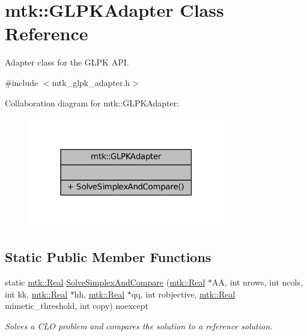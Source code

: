 \hypertarget{classmtk_1_1GLPKAdapter}{\section{mtk\+:\+:G\+L\+P\+K\+Adapter Class Reference}
\label{classmtk_1_1GLPKAdapter}
}


Adapter class for the G\+L\+P\+K A\+P\+I.  




{\ttfamily \#include $<$mtk\+\_\+glpk\+\_\+adapter.\+h$>$}



Collaboration diagram for mtk\+:\+:G\+L\+P\+K\+Adapter\+:\nopagebreak
\begin{figure}[H]
\begin{center}
\leavevmode
\includegraphics[width=243pt]{classmtk_1_1GLPKAdapter__coll__graph}
\end{center}
\end{figure}
\subsection*{Static Public Member Functions}
\begin{DoxyCompactItemize}
\item 
static \hyperlink{group__c01-roots_gac080bbbf5cbb5502c9f00405f894857d}{mtk\+::\+Real} \hyperlink{classmtk_1_1GLPKAdapter_a0c9ebb125445bc5af752bf4fb47f44b2}{Solve\+Simplex\+And\+Compare} (\hyperlink{group__c01-roots_gac080bbbf5cbb5502c9f00405f894857d}{mtk\+::\+Real} $\ast$A\+A, int nrows, int ncols, int kk, \hyperlink{group__c01-roots_gac080bbbf5cbb5502c9f00405f894857d}{mtk\+::\+Real} $\ast$hh, \hyperlink{group__c01-roots_gac080bbbf5cbb5502c9f00405f894857d}{mtk\+::\+Real} $\ast$qq, int robjective, \hyperlink{group__c01-roots_gac080bbbf5cbb5502c9f00405f894857d}{mtk\+::\+Real} mimetic\+\_\+threshold, int copy) noexcept
\begin{DoxyCompactList}\small\item\em Solves a C\+L\+O problem and compares the solution to a reference solution. \end{DoxyCompactList}\end{DoxyCompactItemize}


